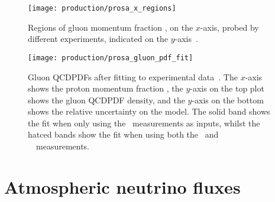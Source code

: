 \begin{figure}
  \centering
  \texttt{[image: production/prosa\_x\_regions]}
  \caption{%
    Regions of gluon momentum fraction \bjorkenx, on the $x$-axis, probed by 
    different experiments, indicated on the $y$-axis~\cite{Zenaiev:2015rfa}.
  }
  \label{fig:prod:theory:prosa_x_regions}
\end{figure}

\begin{figure}
  \centering
  \texttt{[image: production/prosa\_gluon\_pdf\_fit]}
  \caption{%
    Gluon \acp{QCDPDF} after fitting to experimental 
    data~\cite{Zenaiev:2015rfa}.
    The $x$-axis shows the proton momentum fraction \bjorkenx, the $y$-axis on 
    the top plot shows the gluon \ac{QCDPDF} density, and the $y$-axis on the 
    bottom shows the relative uncertainty on the model.
    The solid band shows the fit when only using the \hera\ measurements as 
    inputs, whilst the hatced bands show the fit when using both the \hera\ and 
    \ \lhcb\ measurements.
  }
  \label{fig:prod:theory:prosa_gluon_pdf_fit}
\end{figure}

\section{Atmospheric neutrino fluxes}
\label{chap:prod:theory:neutrinos}

